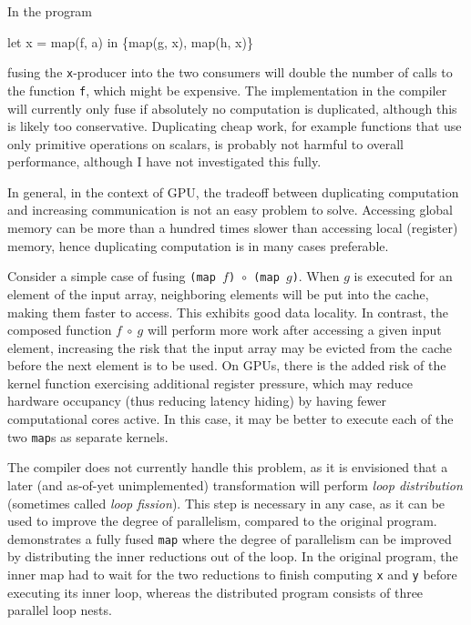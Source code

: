 \begin{description}[style=nextline]
\item[Computation may be duplicated.]

In the program
\begin{colorcode}
let x = map(f, a) in
\{map(g, x), map(h, x)\}
\end{colorcode}
fusing the \texttt{x}-producer into the two consumers will double the
number of calls to the function \texttt{f}, which might be expensive.
The implementation in the \LO{} compiler will currently only fuse if
absolutely no computation is duplicated, although this is likely too
conservative.  Duplicating cheap work, for example functions that use
only primitive operations on scalars, is probably not harmful to
overall performance, although I have not investigated this
fully.

In general, in the context of GPU, the tradeoff between duplicating
computation and increasing communication is not an easy problem to
solve.  Accessing global memory can be more than a hundred times
slower than accessing local (register) memory, hence duplicating
computation is in many cases preferable.

\item[Can reduce memory locality.]

  Consider a simple case of fusing
  \texttt{(map~$f$)~$\circ$~(map~$g$)}.  When $g$ is executed for an
  element of the input array, neighboring elements will be put into
  the cache, making them faster to access.  This exhibits good data
  locality.  In contrast, the composed function $f~\circ~g$ will
  perform more work after accessing a given input element, increasing
  the risk that the input array may be evicted from the cache before
  the next element is to be used.  On GPUs, there is the added risk of
  the kernel function exercising additional register pressure, which
  may reduce hardware occupancy (thus reducing latency hiding) by
  having fewer computational cores active.  In this case, it may be
  better to execute each of the two \texttt{map}s as separate kernels.

  The \LO{} compiler does not currently handle this problem, as it is
  envisioned that a later (and as-of-yet unimplemented) transformation
  will perform \textit{loop distribution} (sometimes called
  \textit{loop fission}).  This step is necessary in any case, as it
  can be used to improve the degree of parallelism, compared to the
  original program.   demonstrates a fully
  fused \texttt{map} where the degree of parallelism can be improved
  by distributing the inner reductions out of the loop.  In the
  original program, the inner map had to wait for the two reductions
  to finish computing \texttt{x} and \texttt{y} before executing its
  inner loop, whereas the distributed program consists of three
  parallel loop nests.
\end{description}

